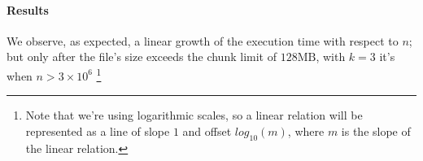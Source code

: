\documentclass[parskip=full]{report}
\begin{document}
\paragraph{Results}
We observe, as expected, a linear growth of the execution time with respect to 
$n$; but only after the file's size exceeds the chunk limit of $128\text{MB}$, 
with $k = 3$ it's when $n > 3 \times 10^6$
\footnote{
	Note that we're using 
	logarithmic scales, so a linear relation will 
	be represented as a line of slope $1$ and offset $log_{10}(m)$, where $m$ 
	is the slope of the linear relation.
}
\end{document}
